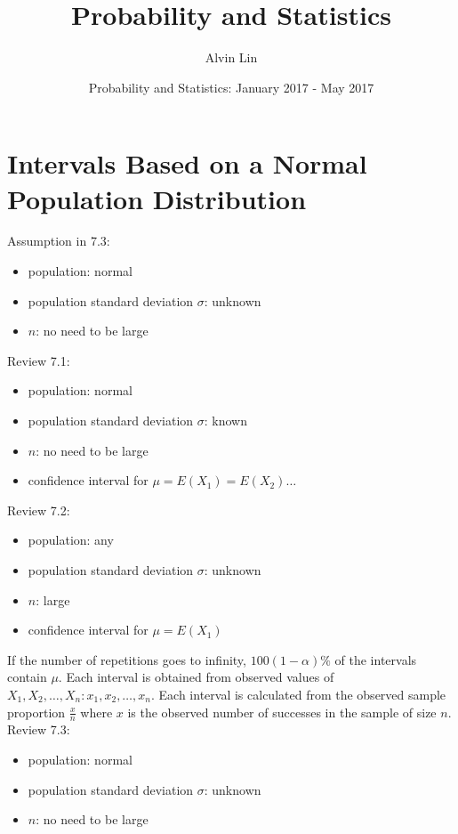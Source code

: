 \documentclass{math}
\title{Probability and Statistics}
\author{Alvin Lin}
\date{Probability and Statistics: January 2017 - May 2017}
\begin{document}
\maketitle

\section*{Intervals Based on a Normal Population Distribution}
Assumption in 7.3:
\begin{itemize}
  \item population: normal
  \item population standard deviation \( \sigma \): unknown
  \item \( n \): no need to be large
\end{itemize}
Review 7.1:
\begin{itemize}
  \item population: normal
  \item population standard deviation \( \sigma \): known
  \item \( n \): no need to be large
  \item confidence interval for \( \mu = E(X_{1}) = E(X_{2})\dots \)
\end{itemize}
Review 7.2:
\begin{itemize}
  \item population: any
  \item population standard deviation \( \sigma \): unknown
  \item \( n \): large
  \item confidence interval for \( \mu = E(X_{1}) \)
\end{itemize}
If the number of repetitions goes to infinity, \( 100(1-\alpha)\% \) of
the intervals contain \( \mu \). Each interval is obtained from observed
values of \( X_{1},X_{2},\dots,X_{n}:x_{1},x_{2},\dots,x_{n} \). Each
interval is calculated from the observed sample proportion \( \frac{x}{n} \)
where \( x \) is the observed number of successes in the sample of size \( n \).
Review 7.3:
\begin{itemize}
  \item population: normal
  \item population standard deviation \( \sigma \): unknown
  \item \( n \): no need to be large
\end{itemize}
\end{document}
